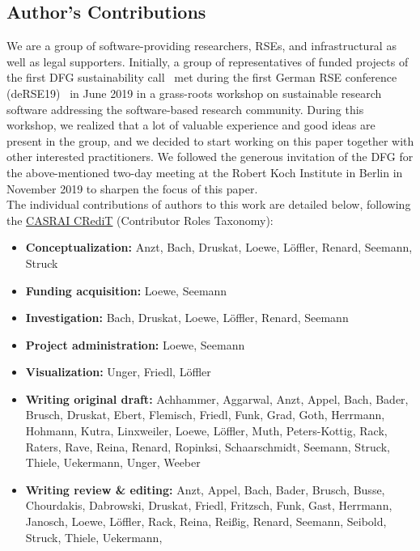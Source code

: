 \documentclass[a4paper,num-refs,numbers,sort&compress]{de-rse}
\begin{document}


\subsection{Author's Contributions}
We are a group of software-providing researchers, RSEs, and infrastructural as well as legal supporters. Initially, a group of representatives of funded projects of the first DFG sustainability call~\cite{DFGfunded} met during the first German RSE conference (deRSE19)~\cite{deRSEconf} in June 2019 in a grass-roots workshop on sustainable research software addressing the software-based research community. During this workshop, we realized that a lot of valuable experience and good ideas are present in the group, and we decided to start working on this paper together with other interested practitioners. We followed the generous invitation of the DFG for the above-mentioned two-day meeting at the Robert Koch Institute in Berlin in November 2019 to sharpen the focus of this paper.\\
The individual contributions of authors to this work are detailed below, following the \href{https://casrai.org/credit/}{CASRAI CRediT} (Contributor Roles Taxonomy):
\begin{itemize}
    \item \textbf{Conceptualization:}  Anzt, Bach, Druskat, Loewe, Löffler,
    Renard, Seemann, Struck
    \item \textbf{Funding acquisition:} Loewe, Seemann
    \item \textbf{Investigation:} Bach, Druskat, Loewe, Löffler, Renard,
    Seemann
    \item \textbf{Project administration:} Loewe, Seemann
    \item \textbf{Visualization:} Unger, Friedl, Löffler
    \item \textbf{Writing original draft:} Achhammer, Aggarwal, Anzt, Appel, Bach, Bader, Brusch, Druskat, Ebert, Flemisch, Friedl, Funk, Grad, Goth, Herrmann, Hohmann, Kutra, Linxweiler, Loewe,
    Löffler, Muth, Peters-Kottig, Rack, Raters, Rave, Reina, Renard, Ropinksi, Schaarschmidt, Seemann, Struck, Thiele, Uekermann, Unger, Weeber
    \item \textbf{Writing review \& editing:} Anzt, Appel, Bach, Bader, Brusch, 
    Busse, Chourdakis, Dabrowski, Druskat, Friedl, Fritzsch, Funk, Gast, Herrmann, Janosch, Loewe, Löffler, Rack, Reina, Reißig,
    Renard, Seemann, Seibold, Struck, Thiele, Uekermann, 
\end{itemize}
\end{document}
